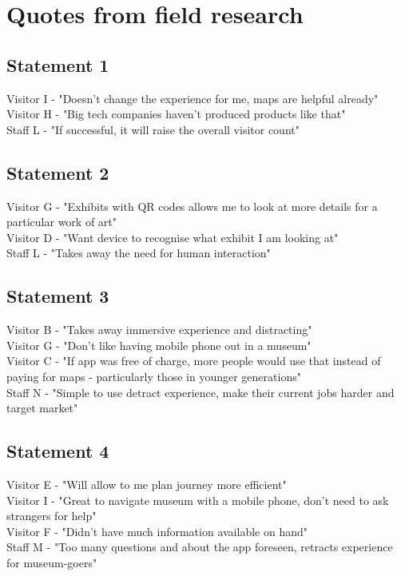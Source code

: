 
\section*{Quotes from field research}
\subsection*{Statement 1}
Visitor I - "Doesn't change the experience for me, maps are helpful already"\\
Visitor H - "Big tech companies haven't produced products like that"\\
Staff L - "If successful, it will raise the overall visitor count"

\subsection*{Statement 2}
Visitor G - "Exhibits with QR codes allows me to look at more details for a particular work of art"\\
Visitor D - "Want device to recognise what exhibit I am looking at"\\
Staff L - "Takes away the need for human interaction"

\subsection*{Statement 3}
Visitor B - "Takes away immersive experience and distracting"\\
Visitor G - "Don't like having mobile phone out in a museum"\\
Visitor C - "If app was free of charge, more people would use that instead of paying for maps - particularly those in younger generations"\\
Staff N - "Simple to use detract experience, make their current jobs harder and target market"

\subsection*{Statement 4}
Visitor E - "Will allow to me plan journey more efficient"\\
Visitor I - "Great to navigate museum with a mobile phone, don't need to ask strangers for help"\\
Visitor F - "Didn't have much information available on hand"\\
Staff M - "Too many questions and about the app foreseen, retracts experience for museum-goers"

